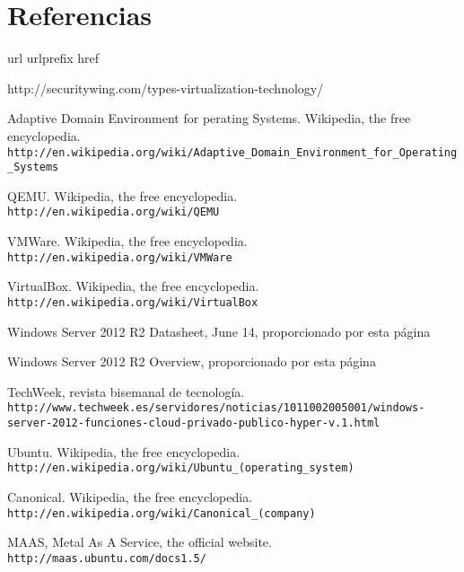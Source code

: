 \documentclass[paper=a4, fontsize=11pt]{scrartcl} %
\numberwithin{equation}{section} %
\numberwithin{figure}{section} %
\numberwithin{table}{section} %
\begin{document}
\section{Referencias}
\begin{thebibliography}{10}
\expandafter\ifx\csname url\endcsname\relax
  \def\url#1{\texttt{#1}}\fi
\expandafter\ifx\csname urlprefix\endcsname\relax\def\urlprefix{URL }\fi
\expandafter\ifx\csname href\endcsname\relax
  \def\href#1#2{#2} \def\path#1{#1}\fi

http://securitywing.com/types-virtualization-technology/

Adaptive Domain Environment for perating Systems. Wikipedia, the free encyclopedia.\\
  \url{http://en.wikipedia.org/wiki/Adaptive_Domain_Environment_for_Operating_Systems}

QEMU. Wikipedia, the free encyclopedia.\\
  \url{http://en.wikipedia.org/wiki/QEMU}

VMWare. Wikipedia, the free encyclopedia.\\
  \url{http://en.wikipedia.org/wiki/VMWare}

VirtualBox. Wikipedia, the free encyclopedia.\\
  \url{http://en.wikipedia.org/wiki/VirtualBox}

Windows Server 2012 R2 Datasheet, June 14, proporcionado por
\href{http://www.microsoft.com/es-es/server-cloud/products/windows-server-2012-r2/}{esta página}

Windows Server 2012 R2 Overview, proporcionado por
\href{http://www.microsoft.com/es-es/server-cloud/products/windows-server-2012-r2/}{esta página}

TechWeek, revista bisemanal de tecnología.\\
  \url{http://www.techweek.es/servidores/noticias/1011002005001/windows-server-2012-funciones-cloud-privado-publico-hyper-v.1.html}

Ubuntu. Wikipedia, the free encyclopedia.\\
  \url{http://en.wikipedia.org/wiki/Ubuntu_(operating_system)}

Canonical. Wikipedia, the free encyclopedia.\\
  \url{http://en.wikipedia.org/wiki/Canonical_(company)}

MAAS, Metal As A Service, the official website.\\
  \url{http://maas.ubuntu.com/docs1.5/}

\end{thebibliography}
\end{document}
